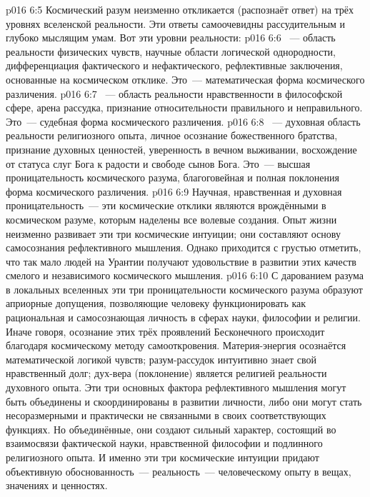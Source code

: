 \vs p016 6:5 Космический разум неизменно откликается (распознаёт ответ) на трёх уровнях вселенской реальности. Эти ответы самоочевидны рассудительным и глубоко мыслящим умам. Вот эти уровни реальности:
\vs p016 6:6 ~--- область реальности физических чувств, научные области логической однородности, дифференциация фактического и нефактического, рефлективные заключения, основанные на космическом отклике. Это~--- математическая форма космического различения.
\vs p016 6:7 ~--- область реальности нравственности в философской сфере, арена рассудка, признание относительности правильного и неправильного. Это~--- судебная форма космического различения.
\vs p016 6:8 ~--- духовная область реальности религиозного опыта, личное осознание божественного братства, признание духовных ценностей, уверенность в вечном выживании, восхождение от статуса слуг Бога к радости и свободе сынов Бога. Это~--- высшая проницательность космического разума, благоговейная и полная поклонения форма космического различения.
\vs p016 6:9 \pc Научная, нравственная и духовная проницательность~--- эти космические отклики являются врождёнными в космическом разуме, которым наделены все волевые создания. Опыт жизни неизменно развивает эти три космические интуиции; они составляют основу самосознания рефлективного мышления. Однако приходится с грустью отметить, что так мало людей на Урантии получают удовольствие в развитии этих качеств смелого и независимого космического мышления.
\vs p016 6:10 \pc С дарованием разума в локальных вселенных эти три проницательности космического разума образуют априорные допущения, позволяющие человеку функционировать как рациональная и самосознающая личность в сферах науки, философии и религии. Иначе говоря, осознание  этих трёх проявлений Бесконечного происходит благодаря космическому методу самооткровения. Материя\hyp{}энергия осознаётся математической логикой чувств; разум\hyp{}рассудок интуитивно знает свой нравственный долг; дух\hyp{}вера (поклонение) является религией реальности духовного опыта. Эти три основных фактора рефлективного мышления могут быть объединены и скоординированы в развитии личности, либо они могут стать несоразмерными и практически не связанными в своих соответствующих функциях. Но объединённые, они создают сильный характер, состоящий во взаимосвязи фактической науки, нравственной философии и подлинного религиозного опыта. И именно эти три космические интуиции придают объективную обоснованность~--- реальность~--- человеческому опыту в вещах, значениях и ценностях.
